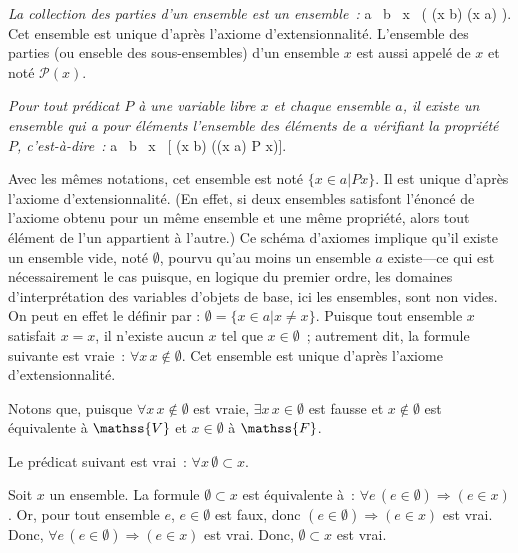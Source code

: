     \done

\blank[medium]

\noindent\emph{ La collection des parties d'un ensemble est un ensemble :} 
\startformula
    \forall a \, \exists b \, \forall x \, (
        (x \in b) \Leftrightarrow (x \subset a)
    ).
\stopformula
Cet ensemble est unique d'après l'axiome d'extensionnalité. 
L'ensemble des parties (ou enseble des sous-ensembles) d'un ensemble $x$ est aussi appelé \emph{} de $x$ et noté $\mathcal{P}(x)$.

\blank[medium]

\noindent\emph{ 
Pour tout prédicat $P$ à une variable libre $x$ et chaque ensemble $a$, il existe un ensemble qui a pour éléments l'ensemble des éléments de $a$ vérifiant la propriété $P$, c'est-à-dire :}
\startformula
\forall a \, \exists b \, \forall x \, [ (x \in b) \Leftrightarrow ((x \in a) \wedge P x)]. 
\stopformula

Avec les mêmes notations, cet ensemble est noté $\lbrace x \in a \vert P x \rbrace$. 
Il est unique d'après l'axiome d'extensionnalité. 
(En effet, si deux ensembles satisfont l'énoncé de l'axiome obtenu pour un même ensemble et une même propriété, alors tout élément de l'un appartient à l'autre.)
Ce schéma d'axiomes implique qu'il existe un ensemble vide, noté $\emptyset$, pourvu qu'au moins un ensemble $a$ existe—ce qui est nécessairement le cas puisque, en logique du premier ordre, les domaines d'interprétation des variables d'objets de base, ici les ensembles, sont non vides. 
On peut en effet le définir par : $\emptyset = \lbrace x \in a \vert x \neq x \rbrace$. 
Puisque tout ensemble $x$ satisfait $x = x$, il n'existe aucun $x$ tel que $x \in \emptyset$ ; autrement dit, la formule suivante est vraie : $\forall x \, x \notin \emptyset$. 
Cet ensemble est unique d'après l'axiome d'extensionnalité.

Notons que, puisque $\forall x \, x \notin \emptyset$ est vraie, $\exists x \, x \in \emptyset$ est fausse et $x \notin \emptyset$ est équivalente à $\mathss{V}$ et $x \in \emptyset$ à $\mathss{F}$.

\blank[medium]

\noindent{} Le prédicat suivant est vrai : $\forall x \, \emptyset \subset x$.

\blank[medium]

\noindent{} Soit $x$ un ensemble. 
    La formule $\emptyset \subset x$ est équivalente à : $\forall e \, (e \in \emptyset) \Rightarrow (e \in x)$. 
    Or, pour tout ensemble $e$, $e \in \emptyset$ est faux, donc $(e \in \emptyset) \Rightarrow (e \in x)$ est vrai.
    Donc, $\forall e \, (e \in \emptyset) \Rightarrow (e \in x)$ est vrai. 
    Donc, $\emptyset \subset x$ est vrai.


